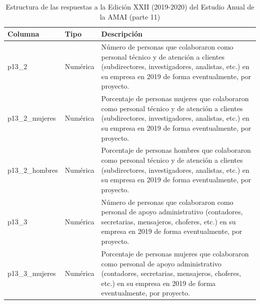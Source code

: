 \begin{table}[]
\caption{Estructura de las respuestas a la Edición XXII (2019-2020) del Estudio Anual de la AMAI (parte 11)}
\label{tab:raw2019_11}
\begin{tabular}{|l|l|l|}
\hline
Columna &
  Tipo &
  Descripción \\ \hline
p13\_2 &
  Numérica &
  \parbox[t]{8cm}{Número de personas que colaboraron como personal técnico y de atención a clientes (subdirectores, investigadores, analistas, etc.) en su empresa en 2019 de forma eventualmente, por proyecto.\vspace{0.1cm}} \\ \hline
p13\_2\_mujeres &
  Numérica &
  \parbox[t]{8cm}{Porcentaje de personas mujeres que colaboraron como personal técnico y de atención a clientes (subdirectores, investigadores, analistas, etc.) en su empresa en 2019 de forma eventualmente, por proyecto.\vspace{0.1cm}} \\ \hline
p13\_2\_hombres &
  Numérica &
  \parbox[t]{8cm}{Porcentaje de personas hombres que colaboraron como personal técnico y de atención a clientes (subdirectores, investigadores, analistas, etc.) en su empresa en 2019 de forma eventualmente, por proyecto.\vspace{0.1cm}} \\ \hline
p13\_3 &
  Numérica &
  \parbox[t]{8cm}{Número de personas que colaboraron como personal de apoyo administrativo (contadores, secretarias, mensajeros, choferes, etc.) en su empresa en 2019 de forma eventualmente, por proyecto.\vspace{0.1cm}} \\ \hline
p13\_3\_mujeres &
  Numérica &
  \parbox[t]{8cm}{Porcentaje de personas mujeres que colaboraron como personal de apoyo administrativo (contadores, secretarias, mensajeros, choferes, etc.)  en su empresa en 2019 de forma eventualmente, por proyecto.\vspace{0.1cm}} \\ \hline
\end{tabular}
\end{table}


